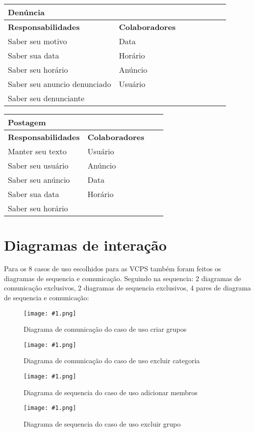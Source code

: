 \documentclass{article}
\newcommand{\diagrama}[2]
{
 \begin{figure}[H]
 \begin{center}
 \texttt{[image: \#1.png]}
 \end{center}
 \caption{#2}
 \label{fig:#1}
 \end{figure}
}
\begin{document}

    \begin{center}
   	 \begin{tabular}{|p{0.5\linewidth}|p{0.5\linewidth}|}
\hline
 	\multicolumn{2}{|p{\textwidth}|}{
{\large \textbf{Denúncia}}
}  \\
\hline
\textbf{Responsabilidades} & \textbf{Colaboradores} \\ 
\hline
  	Saber seu motivo &  Data \\
  	\hline
  	Saber sua data &  Horário \\
  	\hline
  	Saber seu horário &  Anúncio \\
  	\hline
  	Saber seu anuncio denunciado & Usuário \\
  	\hline
  	Saber seu denunciante &  \\
  	\hline
   	\end{tabular} 
    \end{center}


\begin{center}
 \begin{tabular}{|p{0.5\linewidth}|p{0.5\linewidth}|}
  \hline
  \multicolumn{2}{|p{\textwidth}|}{
   {\large \textbf{Postagem}}} \\
  \hline
  \textbf{Responsabilidades} & \textbf{Colaboradores} \\ 
  \hline
  Manter seu texto &  Usuário \\
  \hline
  Saber seu usuário & Anúncio \\
  \hline
  Saber seu anúncio & Data \\
  \hline
  Saber sua data & Horário \\
  \hline
  Saber seu horário &  \\
  \hline 
 \end{tabular} 
\end{center}


\section{Diagramas de interação}

Para os 8 casos de uso escolhidos para as VCPS também foram feitos os diagramas de sequencia e comunicação. Seguindo na sequencia: 2 diagramas de comunicação exclusivos, 2 diagramas de sequencia exclusivos, 4 pares de diagrama de sequencia e comunicação:

\diagrama{com_criargrupo1}{Diagrama de comunicação do caso de uso criar grupos}
\diagrama{com_excluirCategoria1}{Diagrama de comunicação do caso de uso excluir categoria}
\diagrama{seq_adicionarmembros1}{Diagrama de sequencia do caso de uso adicionar membros}
\diagrama{seq_excluirgrupo1}{Diagrama de sequencia do caso de uso excluir grupo}
\end{document}

